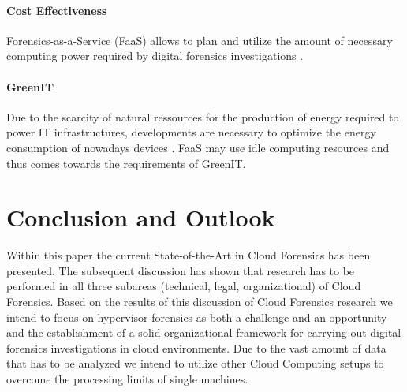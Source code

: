 \documentclass[runningheads,a4paper]{llncs}
\begin{document}
\paragraph{Cost Effectiveness} Forensics-as-a-Service (FaaS) \cite{Ruan2011} allows to plan and utilize the amount of necessary computing power required by digital forensics investigations \cite{Roussev2009}. 

\paragraph{GreenIT} Due to the scarcity of natural ressources for the production of energy required to power IT infrastructures, developments are necessary to optimize the energy consumption of nowadays devices \cite{Baliga2011}. FaaS may use idle computing resources and thus comes towards the requirements of GreenIT. 

\section{Conclusion and Outlook}

Within this paper the current State-of-the-Art in Cloud Forensics has been presented. The subsequent discussion has shown that research has to be performed in all three subareas (technical, legal, organizational) of Cloud Forensics. Based on the results of this discussion of Cloud Forensics research we intend to focus on hypervisor forensics as both a challenge and an opportunity and the establishment of a solid organizational framework for carrying out digital forensics investigations in cloud environments. Due to the vast amount of data that has to be analyzed we intend to utilize other Cloud Computing setups to overcome the processing limits of single machines. 


%
%
%
%
%
%
%

%


\end{document}
